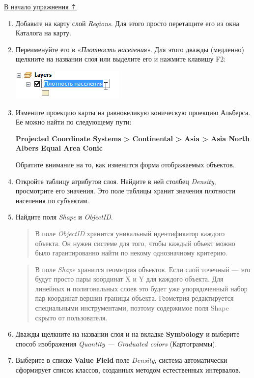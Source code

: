\documentclass[]{book}
\theoremstyle{definition}
\theoremstyle{definition}
\theoremstyle{definition}
\theoremstyle{remark}
\begin{document}
\protect\hyperlink{map-design-economic}{В начало упражнения ⇡}

\begin{enumerate}
\def\labelenumi{\arabic{enumi}.}
\item
  Добавьте на карту слой \emph{Regions}. Для этого просто перетащите его
  из окна Каталога на карту.
\item
  Переименуйте его в «\emph{Плотность населения}». Для этого дважды
  (медленно) щелкните на названии слоя или выделите его и нажмите
  клавишу F2:

  \includegraphics{images/Ex02/image8.png}
\item
  Измените проекцию карты на равновеликую коническую проекцию Альберса.
  Ее можно найти по следующему пути:

  \textbf{Projected Coordinate Systems \textgreater{} Continental
  \textgreater{} Asia \textgreater{} Asia North Albers Equal Area Conic}

  Обратите внимание на то, как изменится форма отображаемых объектов.
\item
  Откройте таблицу атрибутов слоя. Найдите в ней столбец \emph{Density},
  просмотрите его значения. Это поле таблицы хранит значения плотности
  населения по субъектам.
\item
  Найдите поля \emph{Shape} и \emph{ObjectID}.

  \begin{quote}
  В поле \emph{ObjectID} хранится уникальный идентификатор каждого
  объекта. Он нужен системе для того, чтобы каждый объект можно было
  гарантированно найти по некому однозначному критерию.
  \end{quote}

  \begin{quote}
  В поле \emph{Shape} хранится геометрия объектов. Если слой точечный
  --- это будут просто пары координат X и Y для каждого объекта. Для
  линейных и полигональных слоев это будет уже упорядоченный набор пар
  координат вершин границы объекта. Геометрия редактируется специальными
  инструментами, поэтому содержимое поля Shape скрыто от пользователя.
  \end{quote}
\item
  Дважды щелкните на названии слоя и на вкладке \textbf{Symbology} и
  выберите способ изображения \emph{Quantity --- Graduated colors}
  (Картограммы).
\item
  Выберите в списке \textbf{Value Field} поле \emph{Density}, система
  автоматически сформирует список классов, созданных методом
  естественных интервалов.


\end{enumerate}
\end{document}
